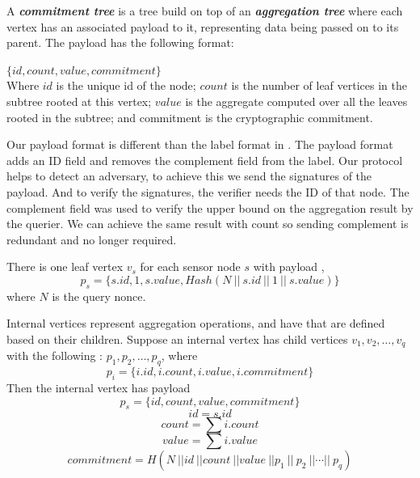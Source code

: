 	\begin{definition}\cite{chan2006secure}
		A \textbf{\textit{commitment tree}} is a tree build on top of an \textbf{\textit{aggregation tree}} where each vertex has an associated payload to it, representing data being passed on to its parent. The payload has the following format:

		$\{id, count, value, commitment\}$\\
		Where $id$ is the unique id of the node; $count$ is the number of leaf vertices in the subtree rooted at this vertex; $value$ is the aggregate computed over all the leaves rooted in the subtree; and commitment is the cryptographic commitment.

	\end{definition}

	Our payload format is different than the label format in \cite{chan2006secure}.
	The payload format adds an ID field and removes the complement field from the label. 
	Our protocol helps to detect an adversary, to achieve this we send the signatures of the payload. 
	And to verify the signatures, the verifier needs the ID of that node.
	The complement field was used to verify the upper bound on the aggregation result by the querier. We can achieve the same result with count so sending complement is redundant and no longer required.     

	There is one leaf vertex $v_{s}$ for each sensor node $s$ with payload ,
	\begin{equation}
		p_{s} = \{ s.id, 1,s.value, Hash( N\ ||\  s.id\ ||\  1\  ||\  s.value ) \} 
	\end{equation}
	where $N$ is the query nonce.

	Internal vertices represent aggregation operations, and have \payloads that are defined based on their children. Suppose an internal vertex has child vertices $v_{1}, v_{2},\dotsc, v_{q}$ with the following \payloads: $p_{1}, p_{2},\dotsc, p_{q}$, where
	\begin{equation}
		p_{i} = \{ i.id, i.count, i.value, i.commitment\} 
	\end{equation}
	Then the internal vertex has payload 
	\begin{equation}
		p_{s} = \{ id, count, value, commitment \} 
	\end{equation}
	\begin{equation}
		id = s.id 
	\end{equation}	
	\begin{equation}
		count = \sum{i.count}		
	\end{equation}
	\begin{equation}
		value = \sum{i.value}		
	\end{equation}
	\begin{equation}
		commitment = H (N\ ||  id\ ||  count\ ||  value\ || p_{1}\ ||\ p_{2}\ || \dotsb ||\ p_{q})		
	\end{equation}

